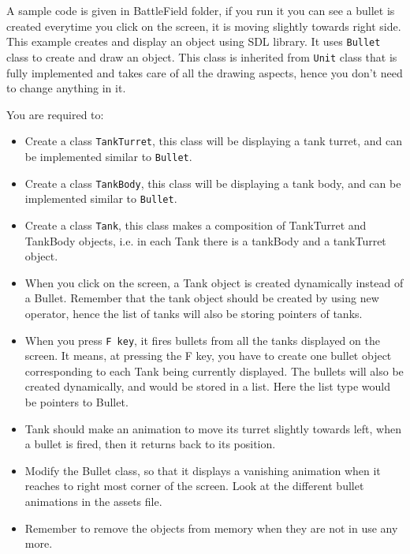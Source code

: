 \documentclass[a4paper,12pt]{article}
\begin{document}
	A sample code is given in BattleField folder, if you run it you can see a bullet is created everytime you click on the screen, it is moving slightly towards right side. This example creates and display an object using SDL library. It uses \texttt{Bullet} class to create and draw an object. This class is inherited from \texttt{Unit} class that is fully implemented and takes care of all the drawing aspects, hence you don't need to change anything in it.
	
	 You are required to:
	 \begin{itemize}
	 	\item Create a class \texttt{TankTurret}, this class will be displaying a tank turret, and can be implemented similar to \texttt{Bullet}.
	 	\item Create a class \texttt{TankBody}, this class will be displaying a tank body, and can be implemented similar to \texttt{Bullet}.
	 	\item Create a class \texttt{Tank}, this class makes a composition of TankTurret and TankBody objects, i.e. in each Tank there is a tankBody and a tankTurret object.
	 	\item When you click on the screen, a Tank object is created dynamically instead of a Bullet. Remember that the tank object should be created by using new operator, hence the list of tanks will also be storing pointers of tanks. 
	 	\item When you press \texttt{F key}, it fires bullets from all the tanks displayed on the screen. It means, at pressing the F key, you have to create one bullet object corresponding to each Tank being currently displayed. The bullets will also be created dynamically, and would be stored in a list. Here the list type would be pointers to Bullet.
	 	\item Tank should make an animation to move its turret slightly towards left, when a bullet is fired, then it returns back to its position.
	 	\item Modify the Bullet class, so that it displays a vanishing animation when it reaches to right most corner of the screen. Look at the different bullet animations in the assets file.

	 	\item Remember to remove the objects from memory when they are not in use any more.
	 \end{itemize}
 
\end{document}
